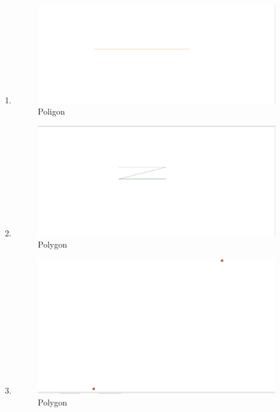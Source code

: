 \begin{enumerate}
	\item 
	
	\begin{figure}[H]
		\includegraphics[width=12cm]{figures/1174039/gambar/hasil6.PNG}
		\centering
		\caption{Poligon}
	\end{figure}
	
	\item 
	
	\begin{figure}[H]
		\includegraphics[width=12cm]{figures/1174039/gambar/hasil7.PNG}
		\centering
		\caption{Polygon}
	\end{figure}
	
	\item 
	
	\begin{figure}[H]
		\includegraphics[width=12cm]{figures/1174039/gambar/hasil1.PNG}
		\centering
		\caption{Polygon}
	\end{figure}
	

\end{enumerate}
